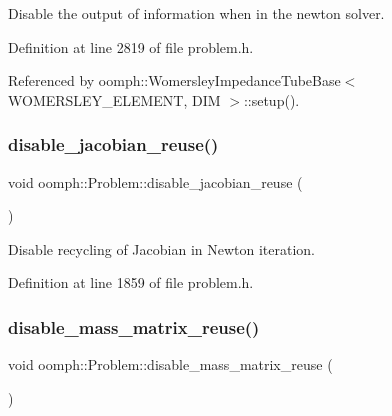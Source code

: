 Disable the output of information when in the newton solver. 



Definition at line 2819 of file problem.\+h.



Referenced by oomph\+::\+Womersley\+Impedance\+Tube\+Base$<$ W\+O\+M\+E\+R\+S\+L\+E\+Y\+\_\+\+E\+L\+E\+M\+E\+N\+T, D\+I\+M $>$\+::setup().

\mbox{\label{classoomph_1_1Problem_a52489fed5942629199e4f720a7a86549}} 
\subsubsection{\texorpdfstring{disable\+\_\+jacobian\+\_\+reuse()}{disable\_jacobian\_reuse()}}
{\footnotesize\ttfamily void oomph\+::\+Problem\+::disable\+\_\+jacobian\+\_\+reuse (\begin{DoxyParamCaption}{ }\end{DoxyParamCaption})\hspace{0.3cm}{\ttfamily [inline]}}



Disable recycling of Jacobian in Newton iteration. 



Definition at line 1859 of file problem.\+h.

\mbox{\label{classoomph_1_1Problem_a399ca4ccf551f9bf5621f9855e899af6}} 
\subsubsection{\texorpdfstring{disable\+\_\+mass\+\_\+matrix\+\_\+reuse()}{disable\_mass\_matrix\_reuse()}}
{\footnotesize\ttfamily void oomph\+::\+Problem\+::disable\+\_\+mass\+\_\+matrix\+\_\+reuse (\begin{DoxyParamCaption}{ }\end{DoxyParamCaption})}



